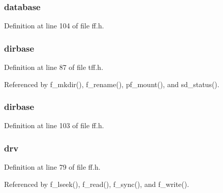 \hypertarget{struct_f_a_t_f_s_a112ba7d33529e5c9fda3b950fff01180}{
\subsubsection[{database}]{ database}}\label{struct_f_a_t_f_s_a112ba7d33529e5c9fda3b950fff01180}


Definition at line 104 of file ff.\-h.

\hypertarget{struct_f_a_t_f_s_a2152449dba421b7671f09ec7fcc7fa4e}{
\subsubsection[{dirbase}]{ dirbase}}\label{struct_f_a_t_f_s_a2152449dba421b7671f09ec7fcc7fa4e}


Definition at line 87 of file tff.\-h.



Referenced by f\-\_\-mkdir(), f\-\_\-rename(), pf\-\_\-mount(), and sd\-\_\-status().

\hypertarget{struct_f_a_t_f_s_aebfa6556d8f94e951a8b2c1eb740e9a1}{
\subsubsection[{dirbase}]{ dirbase}}\label{struct_f_a_t_f_s_aebfa6556d8f94e951a8b2c1eb740e9a1}


Definition at line 103 of file ff.\-h.

\hypertarget{struct_f_a_t_f_s_aabcebc0763f1acbd8928158570150c9f}{
\subsubsection[{drv}]{ drv}}\label{struct_f_a_t_f_s_aabcebc0763f1acbd8928158570150c9f}


Definition at line 79 of file ff.\-h.



Referenced by f\-\_\-lseek(), f\-\_\-read(), f\-\_\-sync(), and f\-\_\-write().


